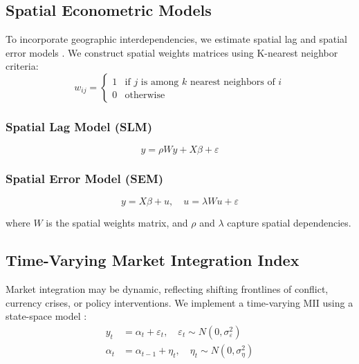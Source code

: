 \subsection{Spatial Econometric Models}
To incorporate geographic interdependencies, we estimate spatial lag and spatial error models \citep{anselin1988spatial, lesage2009}. We construct spatial weights matrices using K-nearest neighbor criteria:
\vspace{-0.5em}
\begin{equation}
w_{ij} = \begin{cases}
1 & \text{if } j \text{ is among } k \text{ nearest neighbors of } i \\
0 & \text{otherwise}
\end{cases}
\end{equation}
\vspace{-0.5em}

\subsubsection{Spatial Lag Model (SLM)}
\vspace{-0.5em}
\begin{equation}
y = \rho W y + X \beta + \varepsilon
\end{equation}
\vspace{-0.5em}

\subsubsection{Spatial Error Model (SEM)}
\vspace{-0.5em}
\begin{equation}
y = X \beta + u, \quad u = \lambda W u + \varepsilon
\end{equation}
\vspace{-0.5em}

where $W$ is the spatial weights matrix, and $\rho$ and $\lambda$ capture spatial dependencies.

\subsection{Time-Varying Market Integration Index}
Market integration may be dynamic, reflecting shifting frontlines of conflict, currency crises, or policy interventions. We implement a time-varying MII using a state-space model \citep{hansen2002testing}:
\vspace{-0.5em}
\begin{equation}
\begin{aligned}
y_t &= \alpha_t + \varepsilon_t, \quad \varepsilon_t \sim N(0, \sigma_\varepsilon^2) \\
\alpha_t &= \alpha_{t-1} + \eta_t, \quad \eta_t \sim N(0, \sigma_\eta^2)
\end{aligned}
\end{equation}
\vspace{-0.5em}

